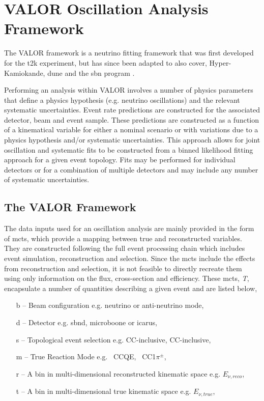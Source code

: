 \chapter{VALOR Oscillation Analysis Framework}
\label{chap:VALOR}

The VALOR framework is a neutrino fitting framework that was first developed for the \gls{t2k} experiment, but has since been adapted to also cover, Hyper-Kamiokande, \gls{dune} and the \gls{sbn} program \cite{VALOR}.

Performing an analysis within VALOR involves a number of physics parameters that define a physics hypothesis (e.g. neutrino oscillations) and the relevant systematic uncertainties. Event rate predictions are constructed for the associated detector, beam and event sample. These predictions are constructed as a function of a kinematical variable for either a nominal scenario or with variations due to a physics hypothesis and/or systematic uncertainties. This approach allows for joint oscillation and systematic fits to be constructed from a binned likelihood fitting approach for a given event topology. Fits may be performed for individual detectors or for a combination of multiple detectors and may include any number of systematic uncertainties. 

\section{The VALOR Framework}\label{sec:VALOR_framework}

The data inputs used for an oscillation analysis are mainly provided in the form of \glspl{mct}, which provide a mapping between true and reconstructed variables. They are constructed following the full event processing chain which includes event simulation, reconstruction and selection. Since the \glspl{mct} include the effects from reconstruction and selection, it is not feasible to directly recreate them using only information on the flux, cross-section and efficiency. These \glspl{mct}, \textit{T}, encapsulate a number of quantities describing a given event and are listed below,

\begin{itemize}
    \item[b] -- Beam configuration e.g. neutrino or anti-neutrino mode,
    \item[d] -- Detector e.g. \gls{sbnd}, \gls{microboone} or \gls{icarus},
    \item[s] -- Topological event selection e.g. \nue CC-inclusive, \numu CC-inclusive,
    \item[m] -- True Reaction Mode e.g. \numu~CCQE, \nue~CC1$\pi^{\pm}$,
    \item[r] -- A bin in multi-dimensional reconstructed kinematic space e.g. $E_{\nu, reco}$,
    \item[t] -- A bin in multi-dimensional true kinematic space e.g. $E_{\nu, true}$,
\end{itemize}


